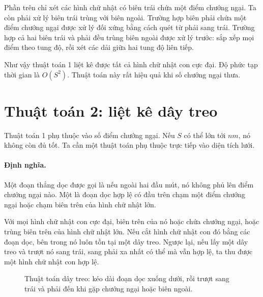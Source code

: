 \documentclass[11pt]{article}
\begin{document}
Phần trên chỉ xét các hình chữ nhật có biên trái chứa một điểm chướng ngại.
Ta còn phải xử lý biên trái trùng với biên ngoài. Trường hợp biên phải chứa
một điểm chướng ngại được xử lý đối xứng bằng cách quét từ phải sang trái.
Trường hợp cả hai biên trái và phải đều trùng biên ngoài được xử lý trước:
sắp xếp mọi điểm theo tung độ, rồi xét các dải giữa hai tung độ liên tiếp.

Như vậy thuật toán 1 liệt kê được tất cả hình chữ nhật con cực đại. Độ phức
tạp thời gian là \(O(S^2)\). Thuật toán này rất hiệu quả khi số chướng ngại
thưa.

\section{Thuật toán 2: liệt kê dây treo}

Thuật toán 1 phụ thuộc vào số điểm chướng ngại. Nếu \(S\) có thể lớn tới
\(n m\), nó không còn đủ tốt. Ta cần một thuật toán phụ thuộc trực tiếp vào
diện tích lưới.

\paragraph{Định nghĩa.}
Một đoạn thẳng dọc được gọi là  nếu ngoài hai đầu mút,
nó không phủ lên điểm chướng ngại nào. Một  là đoạn dọc hợp lệ
có đầu trên chạm một điểm chướng ngại hoặc chạm biên trên của hình chữ nhật
lớn.

Với mọi hình chữ nhật con cực đại, biên trên của nó hoặc chứa chướng ngại,
hoặc trùng biên trên của hình chữ nhật lớn. Nếu cắt hình chữ nhật con đó bằng
các đoạn dọc, bên trong nó luôn tồn tại một dây treo. Ngược lại, nếu lấy một
dây treo và trượt nó sang trái, sang phải xa nhất có thể mà vẫn hợp lệ, ta
thu được một hình chữ nhật con hợp lệ.

\begin{figure}[ht]
\centering
{}
\caption{Thuật toán dây treo: kéo dài đoạn dọc xuống dưới, rồi trượt sang trái
và phải đến khi gặp chướng ngại hoặc biên ngoài.}
\end{figure}
\end{document}
